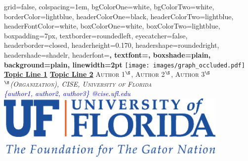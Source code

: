 \documentclass[landscape,final,a0paper,fontscale=0.285]{baposter}
\begin{document}
\begin{poster}%
  {
  grid=false,
  colspacing=1em,
  bgColorOne=white,
  bgColorTwo=white,
  borderColor=lightblue,
  headerColorOne=black,
  headerColorTwo=lightblue,
  headerFontColor=white,
  boxColorOne=white,
  boxColorTwo=lightblue,
  boxpadding=7px,
  textborder=roundedleft,
  eyecatcher=false,
  headerborder=closed,
  headerheight=0.170\textheight,
  headershape=roundedright,
  headershade=shadelr,
  headerfont=\Large\bf\textsc, %
  textfont={\setlength{\parindent}{1.5em}},
  boxshade=plain,
  background=plain,
  linewidth=2pt
  }
  {\texttt{[image: images/graph\_occluded.pdf]}}
  {\vspace*{.3em}\bf{\underline{Topic Line 1}}\vspace{0.1em}
      {\newline\Large\underline{Topic Line 2}}\vspace{0.1em}}
  {\textsc{Author 1$^{\S}$, Author 2$^{\S}$, Author 3$^{\S}$\\[0.1em]
                    {$^{\S}$\textit{(Organization), CISE, University of Florida} }}\\[0.1em]
             {\textit{\textcolor{blue} {\{author1, author2, author3\} @cise.ufl.edu}}}}
  {%
    \includegraphics[height=8.5em]{logo/UF_Signature_Themeline.pdf}
  }\vspace{-3mm}

    \newcommand{\colouredcircle}{%
      \tikz{\useasboundingbox (-0.2em,-0.32em) rectangle(0.2em,0.32em); \draw[draw=black,fill=lightblue,line width=0.03em] (0,0) circle(0.18em);}}


\end{poster}
\end{document}
